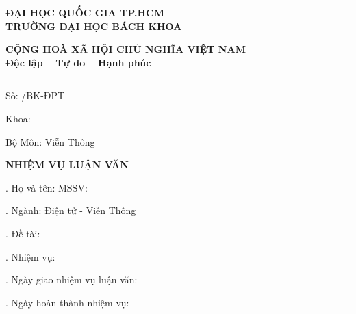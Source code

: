 \thispagestyle{empty}


\begin{center}
\parbox{0.45\textwidth}{
    \centering
    \textbf{\small ĐẠI HỌC QUỐC GIA TP.HCM} \\
    \textbf{\small TRƯỜNG ĐẠI HỌC BÁCH KHOA}
}
\hfill
\parbox{0.45\textwidth}{
    \centering
    \textbf{\small CỘNG HOÀ XÃ HỘI CHỦ NGHĨA VIỆT NAM} \\
    \textbf{\small Độc lập -- Tự do -- Hạnh phúc}
}
\end{center}

\vspace{0.4cm}
\noindent\rule{\textwidth}{0.4pt}
\vspace{0.4cm}

\noindent
Số: \underline{\hspace{3cm}} /BK-ĐPT

\noindent
Khoa: \DEPARTMENT

\noindent
Bộ Môn: Viễn Thông

\vspace{0.6cm}

\begin{center}
    \textbf{\large NHIỆM VỤ LUẬN VĂN}
\end{center}

\vspace{0.6cm}

. Họ và tên: \TENTACGIA \hspace{2cm} MSSV: \MSSV

\vspace{0.3cm}
. Ngành: Điện tử - Viễn Thông

\vspace{0.3cm}
. Đề tài: \TENLUANVAN

\vspace{0.3cm}
. Nhiệm vụ:

\vspace{0.6cm}

. Ngày giao nhiệm vụ luận văn: \dotfill

\vspace{0.3cm}
. Ngày hoàn thành nhiệm vụ: \dotfill

